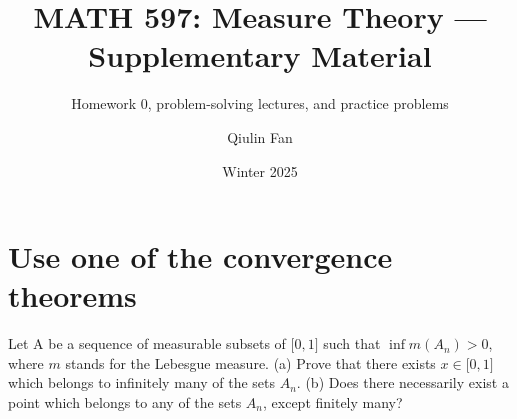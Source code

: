 \documentclass{qlnotes-export}
\title{MATH 597: Measure Theory --- Supplementary Material}
\subtitle{Homework 0, problem-solving lectures, and practice problems}
\author{Qiulin Fan}
\date{Winter 2025}
\begin{document}
\mainmatter
\chapter{Use one of the convergence theorems}\label{use-one-of-the-convergence-theorems}

Let A be a sequence of measurable subsets of \(\lbrack 0,1\rbrack\) such that \(\inf m\left( A_{n} \right) > 0\), where \(m\) stands for the Lebesgue measure. (a) Prove that there exists \(x \in \lbrack 0,1\rbrack\) which belongs to infinitely many of the sets \(A_{n}\). (b) Does there necessarily exist a point which belongs to any of the sets \(A_{n}\), except finitely many?
\end{document}
